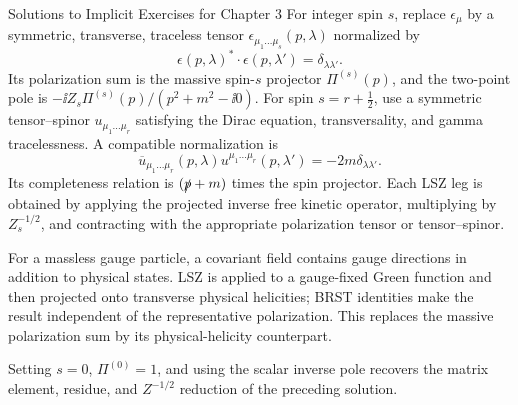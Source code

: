 \begin{bankssolutions}{Solutions to Implicit Exercises for Chapter 3}
For integer spin $s$, replace $\epsilon_\mu$ by a symmetric, transverse,
traceless tensor $\epsilon_{\mu_1\ldots\mu_s}(p,\lambda)$ normalized by
\[
\epsilon(p,\lambda)^*\mathbin{\cdot}\epsilon(p,\lambda')
 =\delta_{\lambda\lambda'}.
\]
Its polarization sum is the massive spin-$s$ projector
$\Pi^{(s)}(p)$, and the two-point pole is
$-\ii Z_s\Pi^{(s)}(p)/(p^2+m^2-\ii0)$.  For spin $s=r+\tfrac12$, use a
symmetric tensor--spinor $u_{\mu_1\ldots\mu_r}$ satisfying the Dirac equation,
transversality, and gamma tracelessness.  A compatible normalization is
\[
 \overline u_{\mu_1\ldots\mu_r}(p,\lambda)
 u^{\mu_1\ldots\mu_r}(p,\lambda')
 =-2m\delta_{\lambda\lambda'}.
\]
Its completeness relation is $(\slashed p+m)$ times the spin projector.
Each LSZ leg is obtained by applying the projected inverse free kinetic
operator, multiplying by $Z_s^{-1/2}$, and contracting with the appropriate
polarization tensor or tensor--spinor.

For a massless gauge particle, a covariant field contains gauge directions in
addition to physical states.  LSZ is applied to a gauge-fixed Green function
and then projected onto transverse physical helicities; BRST identities make
the result independent of the representative polarization.  This replaces
the massive polarization sum by its physical-helicity counterpart.

Setting $s=0$, $\Pi^{(0)}=1$, and using the scalar inverse pole recovers the
matrix element, residue, and $Z^{-1/2}$ reduction of the preceding solution.

\end{bankssolutions}
